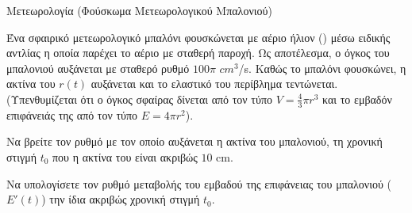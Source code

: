 \begin{problhma}{Μετεωρολογία (Φούσκωμα Μετεωρολογικού Μπαλονιού)}
{\begin{tikzpicture}[>=latex, scale=1]
\end{tikzpicture}}{
Ένα σφαιρικό μετεωρολογικό μπαλόνι φουσκώνεται με αέριο ήλιον () μέσω ειδικής αντλίας η οποία παρέχει το αέριο με σταθερή παροχή. Ως αποτέλεσμα, ο όγκος του μπαλονιού αυξάνεται με σταθερό ρυθμό $100\pi$ $\si{cm}^3$/s. Καθώς το μπαλόνι φουσκώνει, η ακτίνα του $r(t)$ αυξάνεται και το ελαστικό του περίβλημα τεντώνεται. (Υπενθυμίζεται ότι ο όγκος σφαίρας δίνεται από τον τύπο $V = \frac{4}{3}\pi r^3$ και το εμβαδόν επιφάνειάς της από τον τύπο $E = 4\pi r^2$).
\begin{alist}
\item Να βρείτε τον ρυθμό με τον οποίο αυξάνεται η ακτίνα του μπαλονιού, τη χρονική στιγμή $t_0$ που η ακτίνα του είναι ακριβώς $10$ \si{cm}.
\item Να υπολογίσετε τον ρυθμό μεταβολής του εμβαδού της επιφάνειας του μπαλονιού ($E'(t)$) την ίδια ακριβώς χρονική στιγμή $t_0$.
\end{alist}}
\end{problhma}

